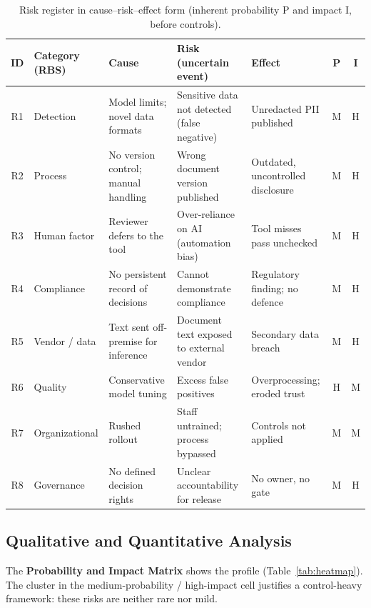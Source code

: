 \documentclass[12pt,a4paper]{article}
\begin{document}
\begin{table}[H]
\centering
\footnotesize
{}
\begin{tabular}{@{} c p{2.3cm} p{2.5cm} p{3.0cm} p{2.9cm} c c @{}}
\toprule
\textbf{\color{accentdark}ID} & \textbf{\color{accentdark}Category (RBS)} & \textbf{\color{accentdark}Cause} & \textbf{\color{accentdark}Risk (uncertain event)} & \textbf{\color{accentdark}Effect} & \textbf{\color{accentdark}P} & \textbf{\color{accentdark}I} \\
\midrule
R1 & Detection & Model limits; novel data formats & Sensitive data not detected (false negative) & Unredacted PII published & M & H \\
R2 & Process & No version control; manual handling & Wrong document version published & Outdated, uncontrolled disclosure & M & H \\
R3 & Human factor & Reviewer defers to the tool & Over-reliance on AI (automation bias) & Tool misses pass unchecked & M & H \\
R4 & Compliance & No persistent record of decisions & Cannot demonstrate compliance & Regulatory finding; no defence & M & H \\
R5 & Vendor / data & Text sent off-premise for inference & Document text exposed to external vendor & Secondary data breach & M & H \\
R6 & Quality & Conservative model tuning & Excess false positives & Overprocessing; eroded trust & H & M \\
R7 & Organizational & Rushed rollout & Staff untrained; process bypassed & Controls not applied & M & M \\
R8 & Governance & No defined decision rights & Unclear accountability for release & No owner, no gate & M & H \\
\bottomrule
\end{tabular}
\caption{Risk register in cause--risk--effect form (inherent probability P and impact I, before controls).}
\label{tab:riskregister}
\end{table}

\subsection{Qualitative and Quantitative Analysis}

The \textbf{Probability and Impact Matrix} \cite{falchi_slides} shows the profile (Table~\ref{tab:heatmap}). The cluster in the medium-probability / high-impact cell justifies a control-heavy framework: these risks are neither rare nor mild.
\end{document}
